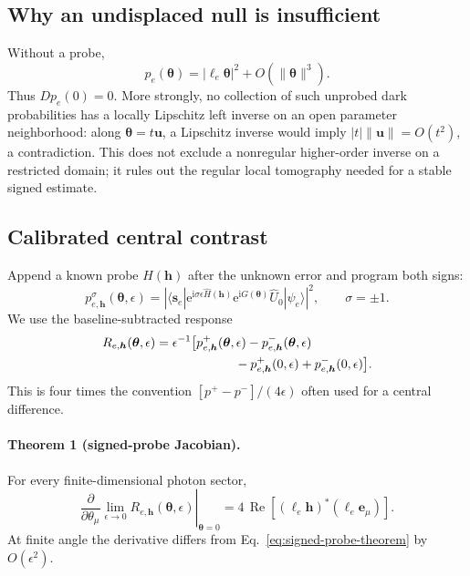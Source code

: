 \documentclass[aps,pra,reprint,amsmath,amssymb,superscriptaddress,longbibliography]{revtex4-2}
\newcommand{\ii}{\mathrm{i}}
\newcommand{\ee}{\mathrm{e}}
\newcommand{\btheta}{\bm{\theta}}
\newcommand{\be}{\bm e}
\begin{document}
\subsection{Why an undisplaced null is insufficient}

Without a probe,
\begin{equation}
 p_e(\btheta)=|\ell_e\btheta|^2+O(\|\btheta\|^3).
\label{eq:quadratic-null}
\end{equation}
Thus $Dp_e(0)=0$.  More strongly, no collection of such unprobed dark
probabilities has a locally Lipschitz left inverse on an open parameter
neighborhood: along $\btheta=t\bm u$, a Lipschitz inverse would imply
$|t|\|\bm u\|=O(t^2)$, a contradiction.  This does not exclude a
nonregular higher-order inverse on a restricted domain; it rules out the
regular local tomography needed for a stable signed estimate.

\subsection{Calibrated central contrast}

Append a known probe $H(\bm h)$ after the unknown error and program both
signs:
\begin{equation}
 p_{e,\bm h}^{\sigma}(\btheta,\epsilon)
 =\left|
 \langle\bm s_e|
 \ee^{\ii\sigma\epsilon\widehat H(\bm h)}
 \ee^{\ii\widehat G(\btheta)}
 \widehat U_0|\psi_e\rangle
 \right|^2,\qquad \sigma=\pm1 .
\label{eq:probe-probability}
\end{equation}
We use the baseline-subtracted response
\begin{align}
 R_{e,\bm h}(\btheta,\epsilon)
 &=
 \epsilon^{-1}\big[
 p^+_{e,\bm h}(\btheta,\epsilon)
 -p^-_{e,\bm h}(\btheta,\epsilon)\nonumber\\
 &\hspace{2.2cm}
 -p^+_{e,\bm h}(0,\epsilon)
 +p^-_{e,\bm h}(0,\epsilon)\big].
\label{eq:response}
\end{align}
This is four times the convention
$[p^+-p^-]/(4\epsilon)$ often used for a central difference.

\paragraph*{Theorem 1 (signed-probe Jacobian).}
For every finite-dimensional photon sector,
\begin{equation}
 \left.
 \frac{\partial}{\partial\theta_\mu}
 \lim_{\epsilon\to0}R_{e,\bm h}(\btheta,\epsilon)
 \right|_{\btheta=0}
 =
 4\,\operatorname{Re}
 \left[(\ell_e\bm h)^*(\ell_e\be_\mu)\right].
\label{eq:signed-probe-theorem}
\end{equation}
At finite angle the derivative differs from
Eq.~\eqref{eq:signed-probe-theorem} by $O(\epsilon^2)$.
\end{document}
